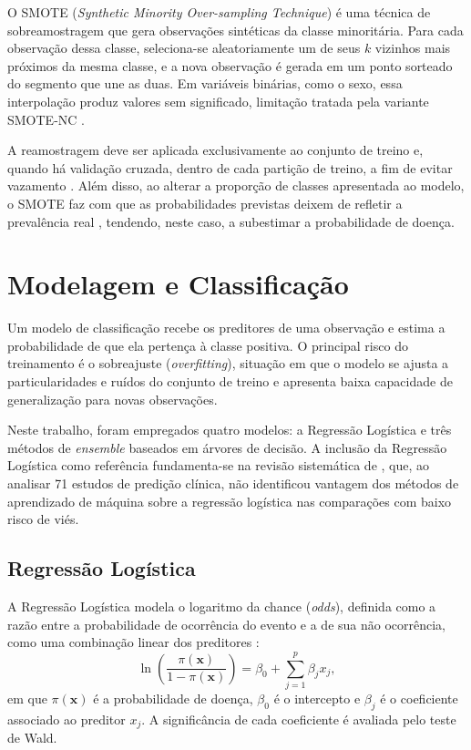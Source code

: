 O SMOTE (\textit{Synthetic Minority Over-sampling Technique}) \cite{smote} é uma técnica de sobreamostragem que gera observações sintéticas da classe minoritária. Para cada observação dessa classe, seleciona-se aleatoriamente um de seus $k$ vizinhos mais próximos da mesma classe, e a nova observação é gerada em um ponto sorteado do segmento que une as duas. Em variáveis binárias, como o sexo, essa interpolação produz valores sem significado, limitação tratada pela variante SMOTE-NC \cite{smote}.

A reamostragem deve ser aplicada exclusivamente ao conjunto de treino e, quando há validação cruzada, dentro de cada partição de treino, a fim de evitar vazamento \cite{KaufmanScharRosset2012}. Além disso, ao alterar a proporção de classes apresentada ao modelo, o SMOTE faz com que as probabilidades previstas deixem de refletir a prevalência real \cite{vandenGoorbergh2022Harm}, tendendo, neste caso, a subestimar a probabilidade de doença.

\section{Modelagem e Classificação}
\label{sec:fund_modelos}

Um modelo de classificação recebe os preditores de uma observação e estima a probabilidade de que ela pertença à classe positiva. O principal risco do treinamento é o sobreajuste (\textit{overfitting}), situação em que o modelo se ajusta a particularidades e ruídos do conjunto de treino e apresenta baixa capacidade de generalização para novas observações.

Neste trabalho, foram empregados quatro modelos: a Regressão Logística e três métodos de \textit{ensemble} baseados em árvores de decisão. A inclusão da Regressão Logística como referência fundamenta-se na revisão sistemática de , que, ao analisar 71 estudos de predição clínica, não identificou vantagem dos métodos de aprendizado de máquina sobre a regressão logística nas comparações com baixo risco de viés.

\subsection{Regressão Logística}
\label{sec:fund_lr}

A Regressão Logística \cite{Cox1958Regression} modela o logaritmo da chance (\textit{odds}), definida como a razão entre a probabilidade de ocorrência do evento e a de sua não ocorrência, como uma combinação linear dos preditores \cite{Hosmer2005Applied}:
\begin{equation}
    \ln\left(\frac{\pi(\mathbf{x})}{1 - \pi(\mathbf{x})}\right) = \beta_0 + \sum_{j=1}^{p} \beta_j x_j,
    \label{eq:logit}
\end{equation}
em que $\pi(\mathbf{x})$ é a probabilidade de doença, $\beta_0$ é o intercepto e $\beta_j$ é o coeficiente associado ao preditor $x_j$. A significância de cada coeficiente é avaliada pelo teste de Wald.


